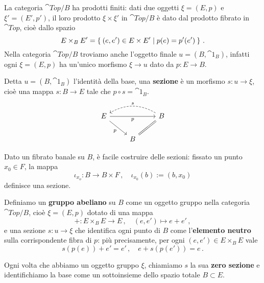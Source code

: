 La categoria $\cat{Top}/B$ ha prodotti finiti: dati due oggetti $\xi = (E,p)$
e $\xi' = (E',p')$, il loro prodotto $\xi \times \xi'$ in $\cat{Top}/B$ 
è dato dal prodotto fibrato in $\cat{Top}$, cioè dallo spazio
\begin{equation*}
	E \times_{B} E' = \Set{(e,e') \in E \times E' | p(e) = p'(e')}\,.
\end{equation*}
Nella categoria $\cat{Top}/B$ troviamo anche l'oggetto finale $u = (B,\cat{1}_{B})$,
infatti ogni $\xi = (E,p)$ ha un'unico morfismo $\xi \to u$
dato da $p:E \to B$.

\begin{df}
	Detta $ u = (B,\cat{1}_{B})$ l'identità della base,
	una \textbf{sezione} è un morfismo $s:u \to \xi$,
	cioè una mappa $s:B \to E$ tale che $p \circ s = \cat{1}_{B}$.
	\begin{equation*}
		\begin{tikzcd}
			E \ar[rr,"p"'] \ar[dr,"p"'] & & B \ar[ll, "s"', bend right, dashed] \ar[dl, equals] \\
			& B &
		\end{tikzcd}
	\end{equation*}
\end{df}

\begin{ex}
	Dato un fibrato banale su $B$, è facile costruire delle sezioni:
	fissato un punto $x_{0} \in F$, la mappa 
	\begin{equation*}
		\iota_{x_{o}} : B \longrightarrow B \times F\,,
		\quad \iota_{x_{0}}(b) := (b,x_{0})
	\end{equation*}
	definisce una sezione.
\end{ex}

\begin{df}
	Definiamo un \textbf{gruppo abeliano} su $B$ come 
	un oggetto gruppo nella categoria $\cat{Top}/B$,
	cioè $\xi = (E,p)$ dotato di una mappa
	\begin{equation*}
		+ : E \times_{B} E \longrightarrow E\,, \quad (e,e') \longmapsto e + e'\,,
	\end{equation*}
	e una sezione $s:u \to \xi$ che identifica ogni punto di $B$
	come  l'\textbf{elemento neutro} sulla corrispondente fibra di $p$:
	più precisamente, per ogni $(e,e') \in E \times_{B} E$ vale
	\begin{equation*}
		s(p(e)) + e' = e'\,, \quad e + s(p(e')) = e\,.
	\end{equation*}
\end{df}

Ogni volta che abbiamo un oggetto gruppo $\xi$,
chiamiamo $s$ la sua \textbf{zero sezione}
e identifichiamo la base come un sottoinsieme dello spazio totale $B \subset E$.

